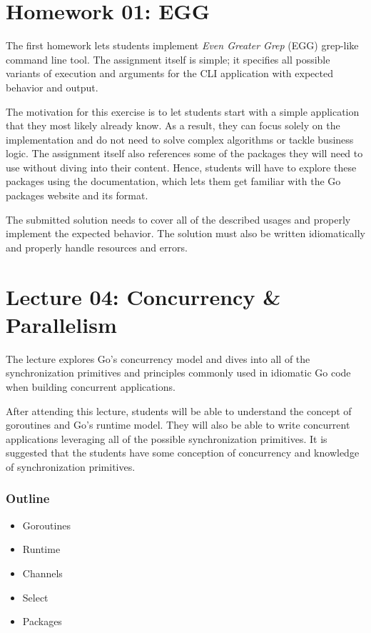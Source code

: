 \documentclass[
  digital,
  color,
  oneside,
  nosansbold,
  nocolorbold,
  nolof,
  nolot,
]{fithesis4}
\begin{document}
\section{Homework 01: EGG}

The first homework lets students implement \textit{Even Greater Grep} (EGG) grep-like command line tool. The assignment itself is simple; it specifies all possible variants of execution and arguments for the CLI application with expected behavior and output.

The motivation for this exercise is to let students start with a simple application that they most likely already know. As a result, they can focus solely on the implementation and do not need to solve complex algorithms or tackle business logic. The assignment itself also references some of the packages they will need to use without diving into their content. Hence, students will have to explore these packages using the documentation, which lets them get familiar with the Go packages\cite{go-packges} website and its format.

The submitted solution needs to cover all of the described usages and properly implement the expected behavior. The solution must also be written idiomatically and properly handle resources and errors.

\section{Lecture 04: Concurrency \& Parallelism}\label{lecture-concurrency}

The lecture explores Go's concurrency model and dives into all of the synchronization primitives and principles commonly used in idiomatic Go code when building concurrent applications.

After attending this lecture, students will be able to understand the concept of goroutines and Go's runtime model. They will also be able to write concurrent applications leveraging all of the possible synchronization primitives. It is suggested that the students have some conception of concurrency and knowledge of synchronization primitives.

\subsubsection{Outline}

\begin{itemize}
    \item Goroutines
    \item Runtime
    \item Channels
    \item Select
    \item Packages
\end{itemize}
\end{document}
